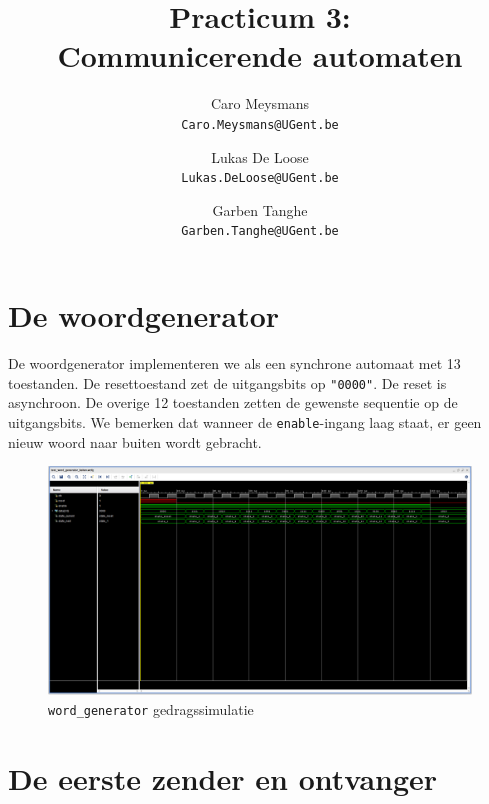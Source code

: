 \documentclass[titlepage]{article}
\title{
    Practicum 3: \\
    \large{Communicerende automaten}
}
\author{
    Caro Meysmans \\
    \texttt{Caro.Meysmans@UGent.be}
    \and
    Lukas De Loose \\
    \texttt{Lukas.DeLoose@UGent.be}
    \and
    Garben Tanghe \\
    \texttt{Garben.Tanghe@UGent.be}
}
\begin{document}
\maketitle

\tableofcontents
\listoffigures

\clearpage

\section{De woordgenerator}

De woordgenerator implementeren we als een synchrone automaat met 13 toestanden.
De resettoestand zet de uitgangsbits op \texttt{"0000"}.
De reset is asynchroon.
De overige 12 toestanden zetten de gewenste sequentie op de uitgangsbits.
We bemerken dat wanneer de \texttt{enable}-ingang laag staat,
er geen nieuw woord naar buiten wordt gebracht.

\begin{figure}[htpb]
    \centering
    \includegraphics[trim={0 500px 0 0}, clip, width =\linewidth]{word_generator_gedragssimulatie.PNG}
    \caption{\texttt{word\_generator} gedragssimulatie}
    \label{fig:word_generator_behav}
\end{figure}

\section{De eerste zender en ontvanger}
\end{document}
